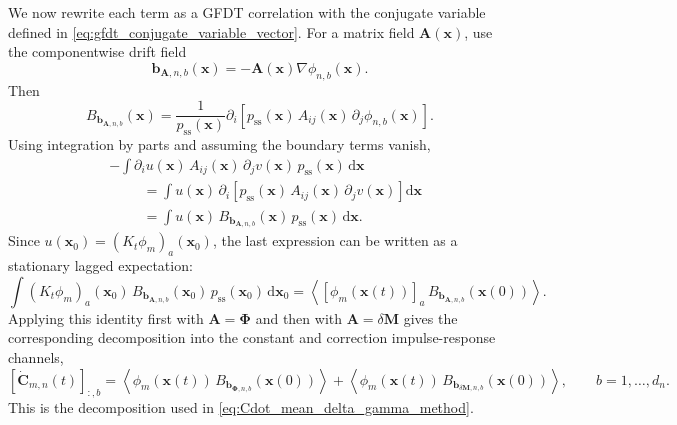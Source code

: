 \documentclass[11pt,twoside,fleqn]{article}
\renewcommand{\d}{\mathrm{d}}
\begin{document}
We now rewrite each term as a GFDT correlation with the conjugate variable
defined in \eqref{eq:gfdt_conjugate_variable_vector}. For a matrix field
\(\bm{A}(\bm{x})\), use the componentwise drift field
\begin{equation}
    \bm{b}_{\bm{A},n,b}(\bm{x})
    =
    -
    \bm{A}(\bm{x})\nabla\phi_{n,b}(\bm{x}) .
    \label{eq:app_b_A_n_b_def}
\end{equation}
Then
\begin{equation}
    B_{\bm{b}_{\bm{A},n,b}}(\bm{x})
    =
    \frac{1}{p_{\mathrm{ss}}(\bm{x})}
    \partial_i
    \left[
        p_{\mathrm{ss}}(\bm{x})\,
        A_{ij}(\bm{x})\,
        \partial_j \phi_{n,b}(\bm{x})
    \right].
    \label{eq:app_B_b_A_component}
\end{equation}
Using integration by parts and assuming the boundary terms vanish,
\begin{align}
    &-
    \int
        \partial_i u(\bm{x})\,
        A_{ij}(\bm{x})\,
        \partial_j v(\bm{x})\,
        p_{\mathrm{ss}}(\bm{x})\,\d\bm{x}
    \nonumber\\
    &\hspace{1cm}
    =
    \int
        u(\bm{x})\,
        \partial_i
        \left[
            p_{\mathrm{ss}}(\bm{x})\,
            A_{ij}(\bm{x})\,
            \partial_j v(\bm{x})
        \right]
        \d\bm{x}
    \nonumber\\
    &\hspace{1cm}
    =
    \int
        u(\bm{x})\,
        B_{\bm{b}_{\bm{A},n,b}}(\bm{x})\,
        p_{\mathrm{ss}}(\bm{x})\,\d\bm{x}.
    \label{eq:app_integration_by_parts_gamma}
\end{align}
Since $u(\bm{x}_0)=(K_t\phi_m)_a(\bm{x}_0)$, the last expression can be written as a stationary lagged expectation:
\begin{equation}
    \int
        (K_t\phi_m)_a(\bm{x}_0)\,
        B_{\bm{b}_{\bm{A},n,b}}(\bm{x}_0)\,
        p_{\mathrm{ss}}(\bm{x}_0)\,\d\bm{x}_0
    =
    \left\langle
        [\phi_m(\bm{x}(t))]_a\,
        B_{\bm{b}_{\bm{A},n,b}}(\bm{x}(0))
    \right\rangle .
    \label{eq:app_semigroup_to_lagged_gamma}
\end{equation}
Applying this identity first with $\bm{A}=\bm{\Phi}$ and then with
$\bm{A}=\delta\bm{M}$ gives the corresponding decomposition into the constant
and correction impulse-response channels,
\begin{equation}
    \left[\dot{\bm{C}}_{m,n}(t)\right]_{:,b}
    =
    \left\langle
        \phi_m(\bm{x}(t))\,
        B_{\bm{b}_{\bm{\Phi},n,b}}(\bm{x}(0))
    \right\rangle
    +
    \left\langle
        \phi_m(\bm{x}(t))\,
        B_{\bm{b}_{\delta\bm{M},n,b}}(\bm{x}(0))
    \right\rangle,
    \qquad
    b=1,\dots,d_n .
    \label{eq:app_Cdot_gamma_Phi_delta_final}
\end{equation}
This is the decomposition used in \eqref{eq:Cdot_mean_delta_gamma_method}.
\end{document}
